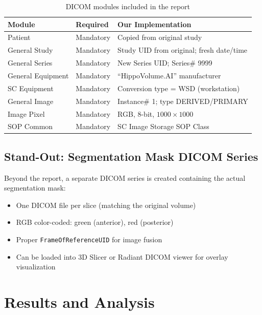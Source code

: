 \documentclass[12pt,a4paper]{report}
\begin{document}
\begin{table}[H]
\centering
\small
\begin{tabular}{lll}
\toprule
\textbf{Module} & \textbf{Required} & \textbf{Our Implementation} \\
\midrule
Patient & Mandatory & Copied from original study \\
General Study & Mandatory & Study UID from original; fresh date/time \\
General Series & Mandatory & New Series UID; Series\# 9999 \\
General Equipment & Mandatory & ``HippoVolume.AI'' manufacturer \\
SC Equipment & Mandatory & Conversion type = WSD (workstation) \\
General Image & Mandatory & Instance\# 1; type DERIVED/PRIMARY \\
Image Pixel & Mandatory & RGB, 8-bit, $1000 \times 1000$ \\
SOP Common & Mandatory & SC Image Storage SOP Class \\
\bottomrule
\end{tabular}
\caption{DICOM modules included in the report}
\end{table}

\section{Stand-Out: Segmentation Mask DICOM Series}

Beyond the report, a separate DICOM series is created containing the actual segmentation mask:
\begin{itemize}
    \item One DICOM file per slice (matching the original volume)
    \item RGB color-coded: green (anterior), red (posterior)
    \item Proper \texttt{FrameOfReferenceUID} for image fusion
    \item Can be loaded into 3D Slicer or Radiant DICOM viewer for overlay visualization
\end{itemize}


\chapter{Results and Analysis}
\end{document}
